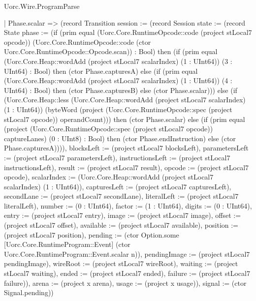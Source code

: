\begin{lexlean}{Uorc.Wire.ProgramParse}
\begin{semanticmodule}
{    | Phase.scalar => (record Transition {session := (record Session {state := (record State {phase := (if (prim equal (Uorc.Core.RuntimeOpcode::code (project stLocal7 opcode)) (Uorc.Core.RuntimeOpcode::code (ctor Uorc.Core.RuntimeOpcode::Opcode.scan)) : Bool) then (if (prim equal (Uorc.Core.Heap::wordAdd (project stLocal7 scalarIndex) (1 : UInt64)) (3 : UInt64) : Bool) then (ctor Phase.capturesA) else (if (prim equal (Uorc.Core.Heap::wordAdd (project stLocal7 scalarIndex) (1 : UInt64)) (4 : UInt64) : Bool) then (ctor Phase.capturesB) else (ctor Phase.scalar))) else (if (Uorc.Core.Heap::less (Uorc.Core.Heap::wordAdd (project stLocal7 scalarIndex) (1 : UInt64)) (byteWord (project (Uorc.Core.RuntimeOpcode::spec (project stLocal7 opcode)) operandCount))) then (ctor Phase.scalar) else (if (prim equal (project (Uorc.Core.RuntimeOpcode::spec (project stLocal7 opcode)) captureLanes) (0 : UInt8) : Bool) then (ctor Phase.endInstruction) else (ctor Phase.capturesA)))), blocksLeft := (project stLocal7 blocksLeft), parametersLeft := (project stLocal7 parametersLeft), instructionsLeft := (project stLocal7 instructionsLeft), result := (project stLocal7 result), opcode := (project stLocal7 opcode), scalarIndex := (Uorc.Core.Heap::wordAdd (project stLocal7 scalarIndex) (1 : UInt64)), capturesLeft := (project stLocal7 capturesLeft), secondLane := (project stLocal7 secondLane), literalLeft := (project stLocal7 literalLeft), number := (0 : UInt64), factor := (1 : UInt64), digits := (0 : UInt64), entry := (project stLocal7 entry), image := (project stLocal7 image), offset := (project stLocal7 offset), available := (project stLocal7 available), position := (project stLocal7 position), pending := (ctor Option.some [Uorc.Core.RuntimeProgram::Event] (ctor Uorc.Core.RuntimeProgram::Event.scalar n)), pendingImage := (project stLocal7 pendingImage), wireRoot := (project stLocal7 wireRoot), waiting := (project stLocal7 waiting), ended := (project stLocal7 ended), failure := (project stLocal7 failure)}), arena := (project x arena), usage := (project x usage)}), signal := (ctor Signal.pending)})
}
\end{semanticmodule}
\end{lexlean}
